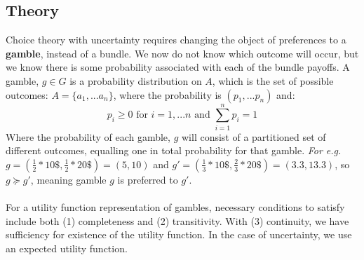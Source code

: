 \documentclass{article}
\begin{document}
\subsection{Theory}
Choice theory with uncertainty requires changing the object of preferences to a \textbf{gamble}, instead of a bundle. We now do not know which outcome will occur, but we know there is some probability associated with each of the bundle payoffs. A gamble, $g \in G$ is a probability distribution on $A$, which is the set of possible outcomes: $A = \{a_1,...a_n \}$, where the probability is $(p_1,...p_n)$ and: \[
p_i \geq 0 \text{ for } i = 1,...n \text{ and } \sum_{i=1}^n p_i = 1
\]
Where the probability of each gamble, $g$ will consist of a partitioned set of different outcomes, equalling one in total probability for that gamble. \textit{For e.g.} $g = (\frac{1}{2}*10\$,  \frac{1}{2}*20\$) = (5,10)$ and $g' = (\frac{1}{3}*10\$,  \frac{2}{3}*20\$) = (3.3, 13.3)$, so $g \succeq g'$, meaning gamble $g$ is preferred to $g'$. \\
\\
\noindent For a utility function representation of gambles, necessary conditions to satisfy include both (1) completeness and (2) transitivity. With (3) continuity, we have sufficiency for existence of the utility function. In the case of uncertainty, we use an expected utility function. 
\end{document}
